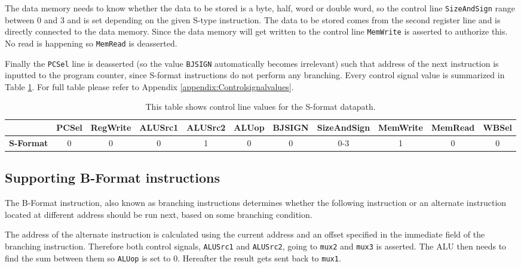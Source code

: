         The data memory needs to know whether the data to be stored is a byte, half, word or double word, so the control line \texttt{SizeAndSign} range between 0 and 3 and is set depending on the given S-type instruction. The data to be stored comes from the second register line and is directly connected to the data memory. Since the data memory will get written to the control line \texttt{MemWrite} is asserted to authorize this. No read is happening so \texttt{MemRead} is deasserted.
        
        Finally the \texttt{PCSel} line is deasserted (so the value \texttt{BJSIGN} automatically becomes irrelevant) such that address of the next instruction is inputted to the program counter, since S-format instructions do not perform any branching. Every control signal value is summarized in Table \ref{table:SFORMAT}. For full table please refer to Appendix \ref{appendix:Controlsignalvalues}.
        
        
        \begin{table}[h!]
            \small
            \hspace{-2.4cm}
            \begin{tabular}{|c||c|c|c|c|c|c|c|c|c|c|}
            	\hline
            	                  & \textbf{PCSel} & \textbf{RegWrite} & \textbf{ALUSrc1} & \textbf{ALUSrc2} & \textbf{ALUop} & \textbf{BJSIGN} & \textbf{SizeAndSign} & \textbf{MemWrite} & \textbf{MemRead} & \textbf{WBSel} \\ \hline\hline
            	\textbf{S-Format} &       0        &         0         &        0         &        1         &       0        &        0        &         0-3          &         1         &        0         &       0        \\ \hline
            \end{tabular}
            \caption{This table shows control line values for the S-format datapath.}
            \label{table:SFORMAT}
        \end{table}
    
    \subsection{Supporting B-Format instructions}
        The B-Format instruction, also known as branching instructions determines whether the following instruction or an alternate instruction located at different address should be run next, based on some branching condition.
        
        The address of the alternate instruction is calculated using the current address and an offset specified in the immediate field of the branching instruction. Therefore both control signals, \texttt{ALUSrc1} and \texttt{ALUSrc2}, going to \texttt{mux2} and \texttt{mux3} is asserted. The ALU then needs to find the sum between them so \texttt{ALUop} is set to 0. Hereafter the result gets sent back to \texttt{mux1}.
        

